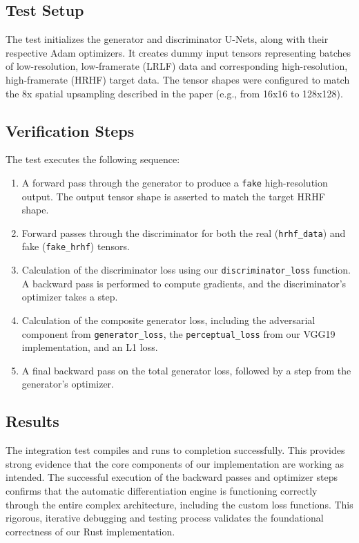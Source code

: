 \documentclass{article}
\begin{document}
\subsection{Test Setup}
The test initializes the generator and discriminator U-Nets, along with their respective Adam optimizers. It creates dummy input tensors representing batches of low-resolution, low-framerate (LRLF) data and corresponding high-resolution, high-framerate (HRHF) target data. The tensor shapes were configured to match the 8x spatial upsampling described in the paper (e.g., from 16x16 to 128x128).

\subsection{Verification Steps}
The test executes the following sequence:
\begin{enumerate}
    \item A forward pass through the generator to produce a \texttt{fake} high-resolution output. The output tensor shape is asserted to match the target HRHF shape.
    \item Forward passes through the discriminator for both the real (\texttt{hrhf_data}) and fake (\texttt{fake_hrhf}) tensors.
    \item Calculation of the discriminator loss using our \texttt{discriminator_loss} function. A backward pass is performed to compute gradients, and the discriminator's optimizer takes a step.
    \item Calculation of the composite generator loss, including the adversarial component from \texttt{generator_loss}, the \texttt{perceptual_loss} from our VGG19 implementation, and an L1 loss.
    \item A final backward pass on the total generator loss, followed by a step from the generator's optimizer.
\end{enumerate}

\subsection{Results}
The integration test compiles and runs to completion successfully. This provides strong evidence that the core components of our implementation are working as intended. The successful execution of the backward passes and optimizer steps confirms that the automatic differentiation engine is functioning correctly through the entire complex architecture, including the custom loss functions. This rigorous, iterative debugging and testing process validates the foundational correctness of our Rust implementation.
\end{document}
